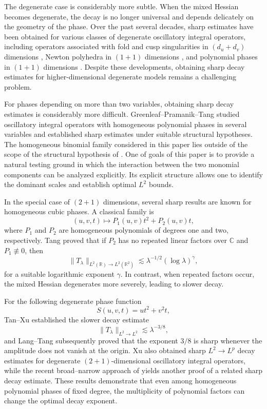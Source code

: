\documentclass[10pt]{amsart}
\numberwithin{equation}{section}
\theoremstyle{definition}
\theoremstyle{remark}
\theoremstyle{remark}
\begin{document}
    The degenerate case is considerably more subtle. When the mixed Hessian becomes degenerate, the decay is no longer universal and depends delicately on the geometry of the phase. Over the past several decades, sharp estimates have been obtained for
    various classes of degenerate oscillatory integral operators,
    including operators associated with fold and cusp singularities in $(d_u+d_v)$ dimensions \cite{GS94,GS98,PS90}, Newton polyhedra in $(1+1)$ dimensions
    \cite{PS97,Va76},
    and polynomial phases in $(1+1)$ dimensions
    \cite{RS87,CCW99}.
    Despite these developments, obtaining sharp decay estimates for
    higher-dimensional degenerate models remains a challenging problem.

    For phases depending on more than two variables, obtaining sharp decay estimates
    is considerably more difficult. Greenleaf--Pramanik--Tang \cite{GPT07} studied
    oscillatory integral operators with homogeneous polynomial phases in several
    variables and established sharp estimates under suitable structural hypotheses. 
    The homogeneous binomial family considered in this paper lies outside of the scope of the structural hypothesis of \cite{GPT07}. One of goals of this paper is to provide a
    natural testing ground in which the interaction between the two monomial
    components can be analyzed explicitly. Its explicit structure allows one to identify the dominant scales and establish optimal $L^2$ bounds.

    In the special case of $(2+1)$ dimensions, several sharp results are known for homogeneous cubic phases. A classical family is
    \[
    (u,v,t)\longmapsto P_1(u,v)t^2+P_2(u,v)t,
    \]
    where $P_1$ and $P_2$ are homogeneous polynomials of degrees one and two,
    respectively. Tang \cite{Ta06} proved that if $P_2$ has no repeated linear
    factors over $\mathbb C$ and $P_1\not\equiv0$, then
    \[
    \|T_\lambda\|_{L^2(\mathbb R)\to L^2(\mathbb R^2)}
    \lesssim
    \lambda^{-1/2}
    (\log\lambda)^\gamma,
    \]
    for a suitable logarithmic exponent $\gamma$.
    In contrast, when repeated factors occur,
    the mixed Hessian degenerates more severely,
    leading to slower decay.

    For the following degenerate phase function
    \[
    S(u,v,t)=ut^2+v^2t,
    \]
    Tan--Xu \cite{TX24} established the slower decay estimate
    \[
    \|T_\lambda\|_{L^2\to L^2}
    \lesssim
    \lambda^{-3/8},
    \]
    and Lang--Tang \cite{LT25} subsequently proved that the exponent $3/8$ is sharp
    whenever the amplitude does not vanish at the origin. Xu \cite{Xu25}
    also obtained sharp $L^2\to L^p$ decay estimates for degenerate
    $(2+1)$-dimensional oscillatory integral operators, while the recent
    broad--narrow approach of \cite{Xu23} yields another proof of a related
    sharp decay estimate. These results demonstrate that even among homogeneous
    polynomial phases of fixed degree, the multiplicity of polynomial factors can
    change the optimal decay exponent.
\end{document}
